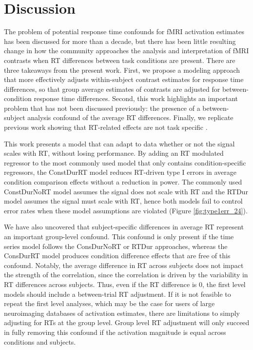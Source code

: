 \documentclass[titlepage,12pt] {article}
\begin{document}
\section*{Discussion}

The problem of potential response time confounds for fMRI activation estimates has been discussed for more than a decade, but there has been little resulting change in how the community approaches the analysis and interpretation of fMRI contrasts when RT differences between task conditions are present.  There are three takeaways from the present work.  First, we propose a modeling approach that more effectively adjusts within-subject contrast estimates for response time differences, so that group average estimates of contrasts are adjusted for between-condition response time differences.  Second, this work highlights an important problem that has not been discussed previously: 
the presence of a between-subject analysis confound of the average RT differences.  Finally, we replicate previous work showing that RT-related effects are not task specific \citep{yarkoni_bold_2009}.

This work presents a model that can adapt to data whether or not the signal scales with RT, without losing performance. By adding an RT modulated regressor to the most commonly used model that only contains condition-specific regressors, the ConstDurRT model reduces RT-driven type I errors in average condition comparison effects without a reduction in power.  The commonly used ConstDurNoRT model assumes the signal does not scale with RT and the RTDur model assumes the signal must scale with RT, hence both models fail to control error rates when these model assumptions are violated (Figure \ref{fig:type1err_24}).  


We have also uncovered that subject-specific differences in average RT represent an important group-level confound.  This confound is only present if the time series model follows the ConsDurNoRT or RTDur approaches, whereas the ConsDurRT model produces condition difference effects that are free of this confound.  Notably, the average difference in RT across subjects does not impact the strength of the correlation, since the correlation is driven by the variability in RT differences across subjects.  Thus, even if the RT difference is 0, the first level models should include a between-trial RT adjustment.  If it is not feasible to repeat the first level analyses, which may be the case for users of large neuroimaging databases of activation estimates, there are limitations to simply adjusting for RTs at the group level. Group level RT adjustment will only succeed in fully removing this confound if the activation magnitude is equal across conditions and subjects.
\end{document}

